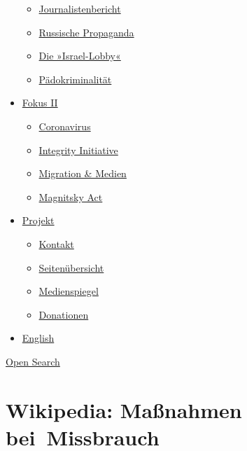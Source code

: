 \begin{itemize}
  \begin{itemize}
  \tightlist
  \item
    \href{https://swprs.org/bericht-eines-journalisten/}{Journalistenbericht}
  \item
    \href{https://swprs.org/russische-propaganda/}{Russische Propaganda}
  \item
    \href{https://swprs.org/die-israel-lobby-fakten-und-mythen/}{Die
    »Israel-Lobby«}
  \item
    \href{https://swprs.org/geopolitik-und-paedokriminalitaet/}{Pädokriminalität}
  \end{itemize}
\item
  \href{https://swprs.org/migration-und-medien/}{Fokus II}

  \begin{itemize}
  \tightlist
  \item
    \href{https://swprs.org/covid-19-hinweis-ii/}{Coronavirus}
  \item
    \href{https://swprs.org/die-integrity-initiative/}{Integrity
    Initiative}
  \item
    \href{https://swprs.org/migration-und-medien/}{Migration \& Medien}
  \item
    \href{https://swprs.org/der-fall-magnitsky/}{Magnitsky Act}
  \end{itemize}
\item
  \href{https://swprs.org/kontakt/}{Projekt}

  \begin{itemize}
  \tightlist
  \item
    \href{https://swprs.org/kontakt/}{Kontakt}
  \item
    \href{https://swprs.org/uebersicht/}{Seitenübersicht}
  \item
    \href{https://swprs.org/medienspiegel/}{Medienspiegel}
  \item
    \href{https://swprs.org/donationen/}{Donationen}
  \end{itemize}
\item
  \href{https://swprs.org/contact/}{English}
\end{itemize}

\protect\hyperlink{}{Open Search}

\hypertarget{wikipedia-mauxdfnahmen-bei-missbrauch}{%
\section{Wikipedia: Maßnahmen
bei~Missbrauch}\label{wikipedia-mauxdfnahmen-bei-missbrauch}}

